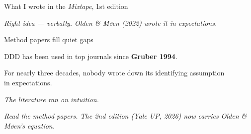 \documentclass[aspectratio=169,11pt]{beamer}
\begin{document}
\begin{frame}{What I wrote in the \textit{Mixtape}, 1st edition}
\vspace{0.4em}
\vspace{0.6em}
\begin{center}
\small\color{warmgray}\itshape
Right idea --- verbally. \;Olden \& Møen (2022) wrote it in expectations.
\end{center}
\end{frame}

\begin{frame}{Method papers fill quiet gaps}
\vspace{1.4em}
\begin{center}
DDD has been used in top journals since \textbf{Gruber 1994}.
\end{center}
\vspace{0.6em}
\begin{center}
For nearly three decades, nobody wrote down its identifying assumption \\[0.2em] in expectations.
\end{center}
\vspace{0.6em}
\begin{center}
\large\itshape\color{charcoal}
The literature ran on intuition.
\end{center}
\vspace{1em}
\begin{center}
\small\color{warmgray}\itshape
Read the method papers. The 2nd edition (Yale UP, 2026) now carries Olden \& Møen's equation.
\end{center}
\end{frame}
\end{document}
